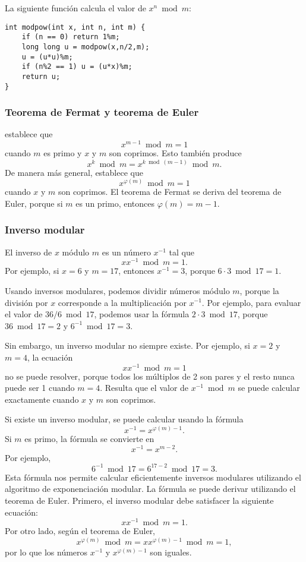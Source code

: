 La siguiente función calcula el valor de
$x^n \bmod m$:

\begin{lstlisting}
int modpow(int x, int n, int m) {
    if (n == 0) return 1%m;
    long long u = modpow(x,n/2,m);
    u = (u*u)%m;
    if (n%2 == 1) u = (u*x)%m;
    return u;
}
\end{lstlisting}

\subsubsection{Teorema de Fermat y teorema de Euler}


establece que
\[x^{m-1} \bmod m = 1\]
cuando $m$ es primo y $x$ y $m$ son coprimos.
Esto también produce
\[x^k \bmod m = x^{k \bmod (m-1)} \bmod m.\]
De manera más general, 
establece que
\[x^{\varphi(m)} \bmod m = 1\]
cuando $x$ y $m$ son coprimos.
El teorema de Fermat se deriva del teorema de Euler,
porque si $m$ es un primo, entonces $\varphi(m)=m-1$.

\subsubsection{Inverso modular}


El inverso de $x$ módulo $m$
es un número $x^{-1}$ tal que
\[ x x^{-1} \bmod m = 1. \]
Por ejemplo, si $x=6$ y $m=17$,
entonces $x^{-1}=3$, porque $6\cdot3 \bmod 17=1$.

Usando inversos modulares, podemos dividir números
módulo $m$, porque la división por $x$
corresponde a la multiplicación por $x^{-1}$.
Por ejemplo, para evaluar el valor de $36/6 \bmod 17$,
podemos usar la fórmula $2 \cdot 3 \bmod 17$,
porque $36 \bmod 17 = 2$ y $6^{-1} \bmod 17 = 3$.

Sin embargo, un inverso modular no siempre existe.
Por ejemplo, si $x=2$ y $m=4$, la ecuación
\[ x x^{-1} \bmod m = 1 \]
no se puede resolver, porque todos los múltiplos de 2
son pares y el resto nunca puede ser 1 cuando $m=4$.
Resulta que el valor de $x^{-1} \bmod m$
se puede calcular exactamente cuando $x$ y $m$ son coprimos.

Si existe un inverso modular, se puede
calcular usando la fórmula
\[
x^{-1} = x^{\varphi(m)-1}.
\]
Si $m$ es primo, la fórmula se convierte en
\[
x^{-1} = x^{m-2}.
\]
Por ejemplo,
\[6^{-1} \bmod 17 =6^{17-2} \bmod 17 = 3.\]
Esta fórmula nos permite calcular eficientemente
inversos modulares utilizando el algoritmo de exponenciación modular.
La fórmula se puede derivar utilizando el teorema de Euler.
Primero, el inverso modular debe satisfacer la siguiente ecuación:
\[
x x^{-1} \bmod m = 1.
\]
Por otro lado, según el teorema de Euler,
\[
x^{\varphi(m)} \bmod m =  xx^{\varphi(m)-1} \bmod m = 1,
\]
por lo que los números $x^{-1}$ y $x^{\varphi(m)-1}$ son iguales.

